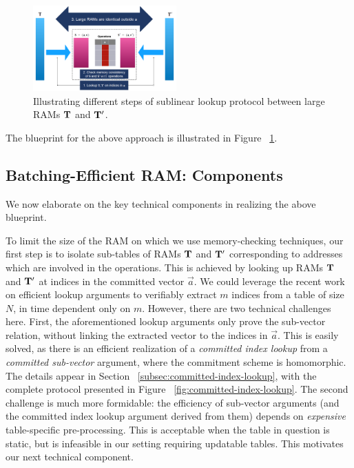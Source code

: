 \begin{figure}[htbp]
    \centering
    \includegraphics[width=0.49\textwidth]{RAM-Lookup}
    \caption{Illustrating different steps of sublinear lookup protocol between large RAMs $\mathbf{T}$ and $\mathbf{T}'$.}
    \label{fig:blueprint}
\end{figure}

The blueprint for the above approach is illustrated in Figure ~\ref{fig:blueprint}.

\subsection{Batching-Efficient RAM: Components}\label{subsec:batching-efficient-ram-components}
We now elaborate on the key technical components in realizing the above blueprint.

\smallskip

 To limit the size of the RAM on which we use memory-checking techniques,
our first step is to isolate sub-tables of RAMs $\mathbf{T}$ and
$\mathbf{T}'$ corresponding to addresses which are involved in the operations.
This is achieved by looking up RAMs $\mathbf{T}$ and
$\mathbf{T}'$ at indices in the committed vector $\vec{a}$. We could leverage the recent work on efficient lookup
arguments to verifiably extract $m$ indices from a table of size $N$, in time dependent only on $m$.
However, there are two technical challenges here. First, the aforementioned lookup arguments only prove the sub-vector
relation, without linking the extracted vector to the indices in $\vec{a}$. This is easily solved, as there
is an efficient realization of a {\em committed index lookup} from a {\em committed sub-vector} argument,
where the commitment scheme is homomorphic. The details appear in Section ~\ref{subsec:committed-index-lookup},
with the complete protocol presented in Figure ~\ref{fig:committed-index-lookup}. The second challenge is much more
formidable: the efficiency of sub-vector arguments (and the committed index lookup argument derived from them)
depends on {\em expensive} table-specific pre-processing. This is acceptable when the table in question is
static, but is infeasible in our setting requiring updatable tables. This motivates our next technical
component.

